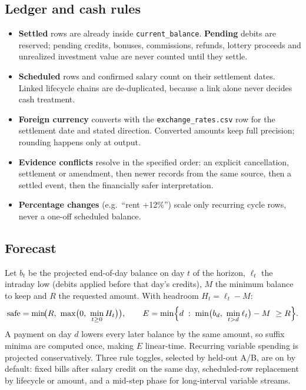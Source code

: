 \documentclass[11pt,a4paper]{article}
\begin{document}
\subsection{Ledger and cash rules}
\begin{itemize}[leftmargin=*,itemsep=1pt]
  \item \textbf{Settled} rows are already inside \texttt{current\_balance}. \textbf{Pending} debits are reserved; pending credits,
        bonuses, commissions, refunds, lottery proceeds and unrealized investment value are never counted until they settle.
  \item \textbf{Scheduled} rows and confirmed salary count on their settlement dates. Linked lifecycle chains are de-duplicated,
        because a link alone never decides cash treatment.
  \item \textbf{Foreign currency} converts with the \texttt{exchange\_rates.csv} row for the settlement date and stated direction.
        Converted amounts keep full precision; rounding happens only at output.
  \item \textbf{Evidence conflicts} resolve in the specified order: an explicit cancellation, settlement or amendment, then newer
        records from the same source, then a settled event, then the financially safer interpretation.
  \item \textbf{Percentage changes} (e.g.\ ``rent +12\%'') scale only recurring cycle rows, never a one-off scheduled balance.
\end{itemize}

\subsection{Forecast}
Let $b_t$ be the projected end-of-day balance on day $t$ of the horizon, $\ell_t$ the intraday low (debits applied before
that day's credits), $M$ the minimum balance to keep and $R$ the requested amount. With headroom $H_t=\ell_t-M$:
\[
  \text{safe} = \min\!\bigl(R,\ \max\bigl(0,\ \min_{t\ge 0} H_t\bigr)\bigr),\qquad
  E = \min\Bigl\{ d \;:\; \min\bigl(b_d,\ \min_{t>d}\ell_t\bigr) - M \ \ge R \Bigr\}.
\]
A payment on day $d$ lowers every later balance by the same amount, so suffix minima are computed once, making $E$
linear-time. Recurring variable spending is projected conservatively. Three rule toggles, selected by held-out A/B,
are on by default: fixed bills after salary credit on the same day, scheduled-row replacement by lifecycle or amount,
and a mid-step phase for long-interval variable streams.
\end{document}
